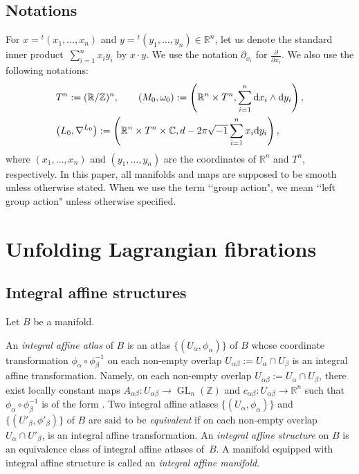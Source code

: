 \documentclass[pdftex]{sigma}
\numberwithin{equation}{section}
\newcommand{\C}{\mathbb{C}}
\newcommand{\R}{\mathbb{R}}
\newcommand{\Z}{\mathbb{Z}}
\def\GL{\operatorname{GL}}
\begin{document}
\subsection{Notations}
For $x={}^t(x_1, \ldots ,x_n)$ and $y={}^t(y_1, \ldots ,y_n)\in \R^n$, let us denote the standard inner product~${\sum_{i=1}^nx_iy_i}$ by $x\cdot y$. We use the notation $\partial_{x_i}$ for $\frac{\partial}{\partial x_i}$. We also use the following notations:
\begin{align*}
&T^n:=(\R/\Z)^n, \qquad
(M_0, \omega_0):=\left( \R^n\times T^n, \sum_{i=1}^n{\rm d}x_i\wedge {\rm d}y_i\right),\\
&\bigl( L_0, \nabla^{L_0}\bigr):=\left(\R^n\times T^n\times \C , d-2\pi\sqrt{-1}\sum_{i=1}^nx_i {\rm d}y_i\right),
\end{align*}
where $(x_1,\ldots ,x_n)$ and $(y_1,\ldots ,y_n)$ are the coordinates of $\R^n$ and $T^n$, respectively. %
In this paper, all manifolds and maps are supposed to be smooth unless otherwise stated. When we use the term \lq\lq group action", we mean \lq\lq left group action" unless otherwise specified.


\section{Unfolding Lagrangian fibrations}\label{Developing Lagrangian fibration}
\subsection{Integral affine structures}
Let $B$ be a manifold.
\begin{Definition}\label{def integral affine structure}
An \emph{integral affine atlas} of $B$ is an atlas $\{ (U_\alpha,\phi_\alpha)\}$ of $B$ whose coordinate transformation $\phi_\alpha\circ \phi_\beta^{-1}$ on each non-empty overlap $U_{\alpha\beta}:=U_\alpha \cap U_\beta$ is an integral affine transformation. Namely, on each non-empty overlap $U_{\alpha\beta}:=U_\alpha \cap U_\beta$, there exist locally constant maps $A_{\alpha\beta}\colon U_{\alpha\beta}\to \GL_n(\Z)$ and $c_{\alpha\beta}\colon U_{\alpha\beta}\to \R^n$ such that $\phi_\alpha\circ \phi_\beta^{-1}$ is of the form .
Two integral affine atlases $\{ (U_\alpha, \phi_\alpha)\}$ and $\{ (U'_\beta ,\phi'_\beta)\}$ of $B$ are said to be \emph{equivalent} if on each non-empty overlap $U_\alpha\cap U'_\beta$,  is an integral affine transformation.
An \emph{integral affine structure} on $B$ is an equivalence class of integral affine atlases of~$B$. A manifold equipped with integral affine structure is called an \emph{integral affine manifold}.
\end{Definition}
\end{document}
